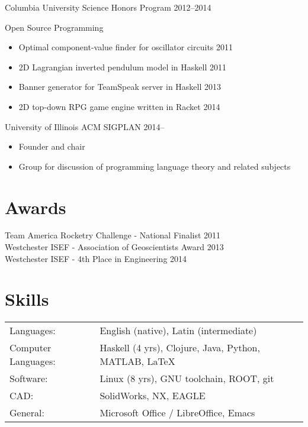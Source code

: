 \documentclass[margin]{res}
\begin{document}
\begin{resume}
Columbia University Science Honors Program \hfill 2012--2014

Open Source Programming
  \begin{itemize} \itemsep -2pt
    \item Optimal component-value finder for oscillator circuits \hfill 2011
    \item 2D Lagrangian inverted pendulum model in Haskell \hfill 2011
    \item Banner generator for TeamSpeak server in Haskell \hfill 2013
    \item 2D top-down RPG game engine written in Racket \hfill 2014
  \end{itemize}

University of Illinois ACM SIGPLAN \hfill 2014--
  \begin{itemize} \itemsep -2pt
    \item Founder and chair
    \item Group for discussion of programming language theory and related subjects
  \end{itemize}
            
\section{Awards} 
Team America Rocketry Challenge - National Finalist \hfill 2011 \\
Westchester ISEF - Association of Geoscientists Award \hfill 2013 \\
Westchester ISEF - 4th Place in Engineering \hfill 2014 \\

\section{Skills}
  \begin{tabular}{l p{4in}} \\
    Languages: & English (native), Latin (intermediate) \\
    Computer Languages: & Haskell (4 yrs), Clojure, Java, Python, MATLAB, \LaTeX \\
    Software: & Linux (8 yrs), GNU toolchain, ROOT, git \\
    CAD: & SolidWorks, NX, EAGLE \\
    General: & Microsoft Office / LibreOffice, Emacs
  \end{tabular}

\newpage


\end{resume}
\end{document}
